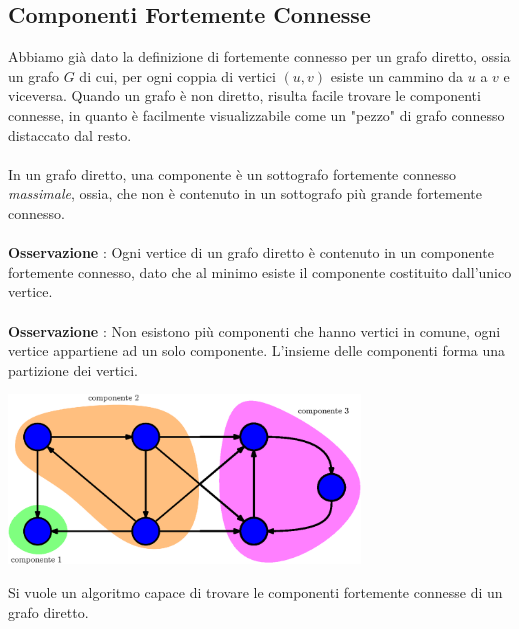 \documentclass[12pt, letterpaper]{article}
\newcommand{\acc}{\\\hphantom{}\\}
\begin{document}
\subsection{Componenti Fortemente Connesse}
Abbiamo già dato la definizione di fortemente connesso per un grafo diretto, ossia un grafo $G$ di cui,
per ogni coppia di vertici $(u,v)$ esiste un cammino da $u$ a $v$ e viceversa. Quando un grafo è non diretto, risulta
facile trovare le componenti connesse, in quanto è facilmente visualizzabile come un "pezzo" di grafo connesso
distaccato dal resto.\acc
In un grafo diretto, una componente è un sottografo fortemente connesso \textit{massimale}, ossia, che non è contenuto in
un sottografo più grande fortemente connesso.\acc
\textbf{Osservazione} : Ogni vertice di un grafo diretto è contenuto in un componente fortemente connesso, dato che
al minimo esiste il componente costituito dall'unico vertice.\acc
\textbf{Osservazione} : Non esistono più componenti che hanno vertici in comune, ogni vertice appartiene ad un solo
componente. L'insieme delle componenti forma una partizione dei vertici.\begin{center}
    \includegraphics[width=0.7\textwidth ]{images/compoGrafDir.eps}
\end{center}
Si vuole un algoritmo capace di trovare le componenti fortemente connesse di un grafo diretto.
\end{document}
